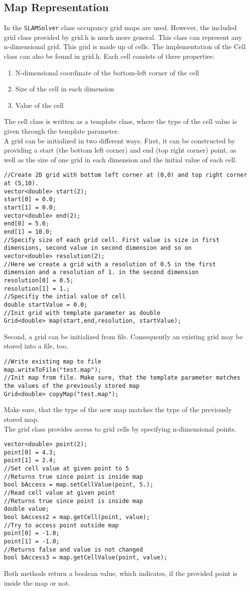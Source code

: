 \documentclass{article}
\newcommand{\SLAM}{\texttt{SLAMSolver} class }
\begin{document}
\subsection{Map Representation}
In the \SLAM occupancy grid maps are used. However, the included grid class provided by grid.h is much more general. This class can represent any n-dimensional grid. This grid is made up of cells. The implementation of the Cell class can also be found in grid.h. Each cell consists of three properties:
\begin{enumerate}
  \item N-dimensional coordinate of the bottom-left corner of the cell
  \item Size of the cell in each dimension
  \item Value of the cell
\end{enumerate}
The cell class is written as a template class, where the type of the cell value is given through the template parameter. \\
A grid can be initialized in two different ways. First, it can be constructed by providing a start (the bottom left corner) and end (top right corner) point, as well as the size of one grid in each dimension and the initial value of each cell.
\begin{lstlisting}
//Create 2D grid with bottom left corner at (0,0) and top right corner at (5,10).
vector<double> start(2);
start[0] = 0.0;
start[1] = 0.0;
vector<double> end(2);
end[0] = 5.0;
end[1] = 10.0;
//Specify size of each grid cell. First value is size in first dimensions, second value in second dimension and so on
vector<double> resolution(2);
//Here we create a grid with a resolution of 0.5 in the first dimension and a resolution of 1. in the second dimension
resolution[0] = 0.5;
resolution[1] = 1.;
//Specifiy the intial value of cell
double startValue = 0.0;
//Init grid with template parameter as double
Grid<double> map(start,end,resolution, startValue);
\end{lstlisting} 
Second, a grid can be initialized from file. Consequently an existing grid may be stored into a file, too.
\begin{lstlisting}
//Write existing map to file
map.writeToFile("test.map");
//Init map from file. Make sure, that the template parameter matches the values of the previously stored map
Grid<double> copyMap("test.map");
\end{lstlisting}
Make sure, that the type of the new map matches the type of the previously stored map. \\
The grid class provides access to grid cells by specifying n-dimensional points.
\begin{lstlisting}
vector<double> point(2);
point[0] = 4.3;
point[1] = 2.4;
//Set cell value at given point to 5
//Returns true since point is inside map
bool bAccess = map.setCellValue(point, 5.);
//Read cell value at given point
//Returns true since point is inside map
double value;
bool bAccess2 = map.getCell(point, value);
//Try to access point outside map
point[0] = -1.0;
point[1] = -1.0;
//Returns false and value is not changed
bool bAccess3 = map.getCellValue(point, value);
\end{lstlisting}
Both methods return a boolean value, which indicates, if the provided point is inside the map or not.
\newpage
\end{document}
